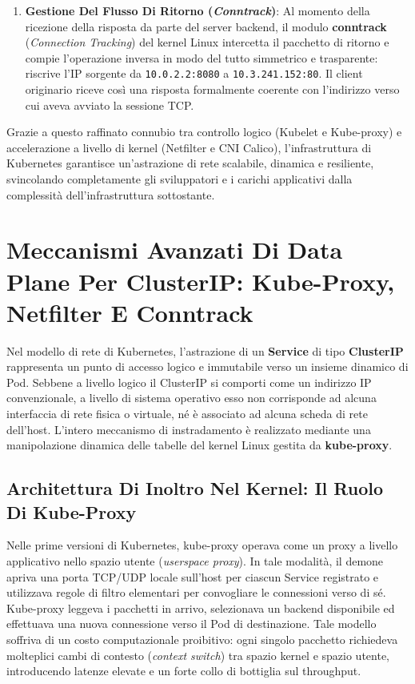 \documentclass[11pt, a4paper]{article}
\begin{document}
\begin{enumerate}
    \item \textbf{Gestione Del Flusso Di Ritorno (\emph{Conntrack})}:
    Al momento della ricezione della risposta da parte del server backend, il modulo \textbf{conntrack} (\emph{Connection Tracking}) del kernel Linux intercetta il pacchetto di ritorno e compie l'operazione inversa in modo del tutto simmetrico e trasparente: riscrive l'IP sorgente da \texttt{10.0.2.2:8080} a \texttt{10.3.241.152:80}. Il client originario riceve così una risposta formalmente coerente con l'indirizzo verso cui aveva avviato la sessione TCP.
\end{enumerate}

Grazie a questo raffinato connubio tra controllo logico (Kubelet e Kube-proxy) e accelerazione a livello di kernel (Netfilter e CNI Calico), l'infrastruttura di Kubernetes garantisce un'astrazione di rete scalabile, dinamica e resiliente, svincolando completamente gli sviluppatori e i carichi applicativi dalla complessità dell'infrastruttura sottostante.



\section{Meccanismi Avanzati Di Data Plane Per ClusterIP: Kube-Proxy, Netfilter E Conntrack}

Nel modello di rete di Kubernetes, l'astrazione di un \textbf{Service} di tipo \textbf{ClusterIP} rappresenta un punto di accesso logico e immutabile verso un insieme dinamico di Pod. Sebbene a livello logico il ClusterIP si comporti come un indirizzo IP convenzionale, a livello di sistema operativo esso non corrisponde ad alcuna interfaccia di rete fisica o virtuale, né è associato ad alcuna scheda di rete dell'host. L'intero meccanismo di instradamento è realizzato mediante una manipolazione dinamica delle tabelle del kernel Linux gestita da \textbf{kube-proxy}.

\subsection{Architettura Di Inoltro Nel Kernel: Il Ruolo Di Kube-Proxy}
Nelle prime versioni di Kubernetes, kube-proxy operava come un proxy a livello applicativo nello spazio utente (\emph{userspace proxy}). In tale modalità, il demone apriva una porta TCP/UDP locale sull'host per ciascun Service registrato e utilizzava regole di filtro elementari per convogliare le connessioni verso di sé. Kube-proxy leggeva i pacchetti in arrivo, selezionava un backend disponibile ed effettuava una nuova connessione verso il Pod di destinazione. Tale modello soffriva di un costo computazionale proibitivo: ogni singolo pacchetto richiedeva molteplici cambi di contesto (\emph{context switch}) tra spazio kernel e spazio utente, introducendo latenze elevate e un forte collo di bottiglia sul throughput.
\end{document}
